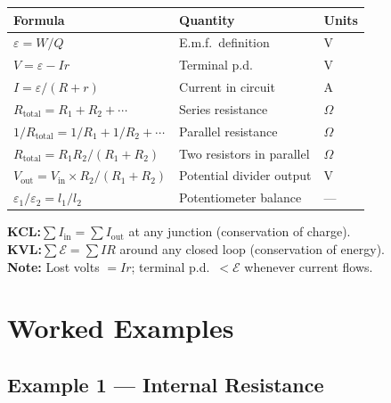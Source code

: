 \begin{minipage}{\linewidth}
\begin{tcolorbox}[colback=lightgold, colframe=accentgold]
\renewcommand{\arraystretch}{1.8}
\begin{tabular}{@{}lll@{}}
\toprule
\textbf{Formula} & \textbf{Quantity} & \textbf{Units} \\
\midrule
$\varepsilon = W/Q$ & E.m.f.\ definition & V \\
$V = \varepsilon - Ir$ & Terminal p.d. & V \\
$I = \varepsilon/(R + r)$ & Current in circuit & A \\
$R_{\text{total}} = R_1 + R_2 + \cdots$ & Series resistance & $\Omega$ \\
$1/R_{\text{total}} = 1/R_1 + 1/R_2 + \cdots$ & Parallel resistance & $\Omega$ \\
$R_{\text{total}} = R_1 R_2/(R_1+R_2)$ & Two resistors in parallel & $\Omega$ \\
$V_{\text{out}} = V_{\text{in}} \times R_2/(R_1+R_2)$ & Potential divider output & V \\
$\varepsilon_1/\varepsilon_2 = l_1/l_2$ & Potentiometer balance & — \\
\bottomrule
\end{tabular}
\end{tcolorbox}

\vspace{0.5em}
\begin{tcolorbox}[colback=lightblue, colframe=darkblue]
\textbf{KCL:}\quad $\sum I_{\text{in}} = \sum I_{\text{out}}$ at any junction (conservation of charge).\\[0.3em]
\textbf{KVL:}\quad $\sum \mathcal{E} = \sum IR$ around any closed loop (conservation of energy).\\[0.3em]
\textbf{Note:} Lost volts $= Ir$; terminal p.d.\ $< \mathcal{E}$ whenever current flows.
\end{tcolorbox}
\end{minipage}

\section{Worked Examples}

\subsection*{Example 1 — Internal Resistance}

